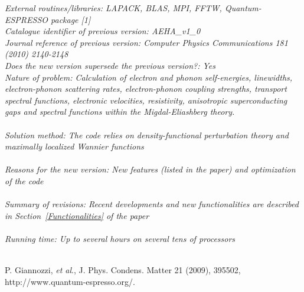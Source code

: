 \documentclass[final,3p,times,twocolumn]{elsarticle}
\begin{document}
\begin{small}
{\em External routines/libraries: LAPACK, BLAS, MPI, FFTW, Quantum-ESPRESSO package [1]}   \\
{\em Catalogue identifier of previous version: AEHA\_v1\_0 }             \\
{\em Journal reference of previous version: Computer Physics Communications 181 (2010) 2140-2148 }                  \\
{\em Does the new version supersede the previous version?: Yes}   \\
{\em Nature of problem: Calculation of electron and phonon self-energies, linewidths, electron-phonon scattering rates, electron-phonon coupling strengths, transport spectral functions, electronic velocities, resistivity, anisotropic superconducting gaps and spectral functions within the Migdal-Eliashberg theory. }\\
   \\
{\em Solution method: The code relies on density-functional perturbation theory and maximally localized Wannier functions}\\
   \\
{\em Reasons for the new version: New features (listed in the paper) and optimization of the code}\\
   \\
{\em Summary of revisions: Recent developments and new functionalities are described in Section~\ref{Functionalities} of the paper}\\
   \\
{\em Running time: Up to several hours on several tens of processors}\\
   \\

\begin{thebibliography}{0}
 P. Giannozzi, \textit{et al}., J. Phys. Condens. Matter 21 (2009), 395502, http://www.quantum-espresso.org/.      
\end{thebibliography}

\end{small}
\end{document}
